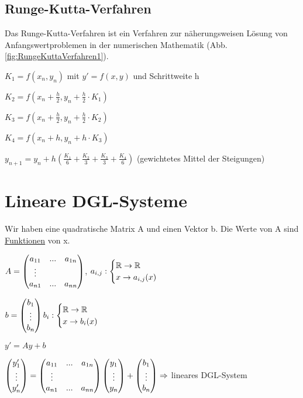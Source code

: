 \renewcommand{\ldate}{2015-12-11}

\subsection{Runge-Kutta-Verfahren}
Das Runge-Kutta-Verfahren ist ein Verfahren zur näherungsweisen Lösung von Anfangswertproblemen in der numerischen Mathematik (Abb. \ref{fig:RungeKuttaVerfahren1}).

$ K_1 = f(x_{n}, y_{n})$ mit $y'=f(x,y)$ und Schrittweite h

$ K_2 = f(x_{n} + \frac{h}{2}, y_{n} + \frac{h}{2} \cdot K_1)$

$ K_3 = f(x_{n} + \frac{h}{2}, y_{n} + \frac{h}{2} \cdot K_2)$

$ K_4 = f(x_{n} + h, y_{n} + h \cdot K_3)$

$y_{n+1} = y_n + h (\frac{K_1}{6} + \frac{K_2}{3} + \frac{K_3}{3} + \frac{K_4}{6})$ (gewichtetes Mittel der Steigungen) 

\section{Lineare DGL-Systeme}
Wir haben eine quadratische Matrix A und einen Vektor b. Die Werte von A sind \underline{Funktionen} von x. 

$A =  \begin{pmatrix} a_{11} & ... & a_{1n}\\\vdots\\a_{n1} &  ... & a_{nn} \end{pmatrix} $,
$a_{i,j} : \begin{cases} \mathbb{R} \rightarrow \mathbb{R}\\x\rightarrow a_{i,j}(x) \end{cases}$

$b= \begin{pmatrix} b_1\\\vdots\\b_n \end{pmatrix}  b_i : \begin{cases} \mathbb{R} \rightarrow \mathbb{R}\\x\rightarrow b_{i}(x) \end{cases}$

$y' = Ay + b$

$ \begin{pmatrix} y_1'\\\vdots\\y_n' \end{pmatrix}  =  \begin{pmatrix} a_{11} &  ... &  a_{1n}\\\vdots\\a_{n1} &  ... &  a_{nn} \end{pmatrix}   \begin{pmatrix} y_1\\\vdots\\y_n \end{pmatrix}  +  \begin{pmatrix} b_1\\\vdots\\b_n \end{pmatrix}  \Rightarrow $ lineares DGL-System

